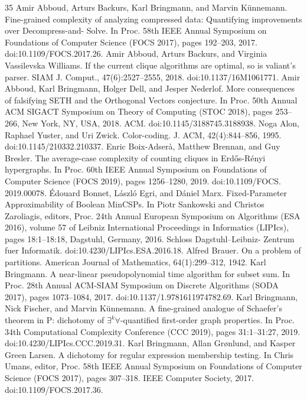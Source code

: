 \documentclass[10pt,a4paper]{article}
\theoremstyle{plain}
\begin{document}
\begin{thebibliography}{35}
Amir Abboud, Arturs Backurs, Karl Bringmann, and Marvin Künnemann. Fine-grained complexity of analyzing compressed data: Quantifying improvements over Decompress-and- Solve. In Proc. 58th IEEE Annual Symposium on Foundations of Computer Science (FOCS 2017), pages 192–203, 2017. doi:10.1109/FOCS.2017.26.
Amir Abboud, Arturs Backurs, and Virginia Vassilevska Williams. If the current clique algorithms are optimal, so is valiant’s parser. SIAM J. Comput., 47(6):2527–2555, 2018. doi:10.1137/16M1061771.
Amir Abboud, Karl Bringmann, Holger Dell, and Jesper Nederlof. More consequences of falsifying SETH and the Orthogonal Vectors conjecture. In Proc. 50th Annual ACM SIGACT Symposium on Theory of Computing (STOC 2018), pages 253–266, New York, NY, USA, 2018. ACM. doi:10.1145/3188745.3188938.
Noga Alon, Raphael Yuster, and Uri Zwick. Color-coding. J. ACM, 42(4):844–856, 1995. doi:10.1145/210332.210337.
Enric Boix-Adserà, Matthew Brennan, and Guy Bresler. The average-case complexity of counting cliques in Erdős-Rényi hypergraphs. In Proc. 60th IEEE Annual Symposium on Foundations of Computer Science (FOCS 2019), pages 1256–1280, 2019. doi:10.1109/FOCS. 2019.00078.
Édouard Bonnet, László Egri, and Dániel Marx. Fixed-Parameter Approximability of Boolean MinCSPs. In Piotr Sankowski and Christos Zaroliagis, editors, Proc. 24th Annual European Symposium on Algorithms (ESA 2016), volume 57 of Leibniz International Proceedings in Informatics (LIPIcs), pages 18:1–18:18, Dagstuhl, Germany, 2016. Schloss Dagstuhl–Leibniz- Zentrum fuer Informatik. doi:10.4230/LIPIcs.ESA.2016.18.
Alfred Brauer. On a problem of partitions. American Journal of Mathematics, 64(1):299–312, 1942.
Karl Bringmann. A near-linear pseudopolynomial time algorithm for subset sum. In Proc. 28th Annual ACM-SIAM Symposium on Discrete Algorithms (SODA 2017), pages 1073–1084, 2017. doi:10.1137/1.9781611974782.69.
Karl Bringmann, Nick Fischer, and Marvin Künnemann. A fine-grained analogue of Schaefer’s theorem in P: dichotomy of $\exists^k\forall$-quantified first-order graph properties. In Proc. 34th Computational Complexity Conference (CCC 2019), pages 31:1–31:27, 2019. doi:10.4230/LIPIcs.CCC.2019.31.
Karl Bringmann, Allan Grønlund, and Kasper Green Larsen. A dichotomy for regular expression membership testing. In Chris Umans, editor, Proc. 58th IEEE Annual Symposium on Foundations of Computer Science (FOCS 2017), pages 307–318. IEEE Computer Society, 2017. doi:10.1109/FOCS.2017.36.

\end{thebibliography}
\end{document}
